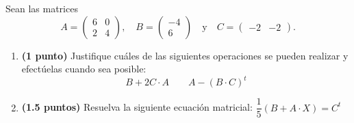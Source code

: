 
Sean las matrices
\[
A=\begin{pmatrix}6&0\\2&4\end{pmatrix},\quad B=\begin{pmatrix}-4\\6\end{pmatrix}\quad\text{y}\quad C=\begin{pmatrix}-2&-2\end{pmatrix}.
\]
\begin{enumerate}[label=\alph*)]
\item \textbf{(1 punto)} Justifique cuáles de las siguientes operaciones se pueden realizar y efectúelas cuando sea posible:
\[
B+2C\cdot A\qquad A-(B\cdot C)^t
\]
\item \textbf{(1.5 puntos)} Resuelva la siguiente ecuación matricial: $\dfrac{1}{5}(B+A\cdot X)=C^t$
\end{enumerate}
